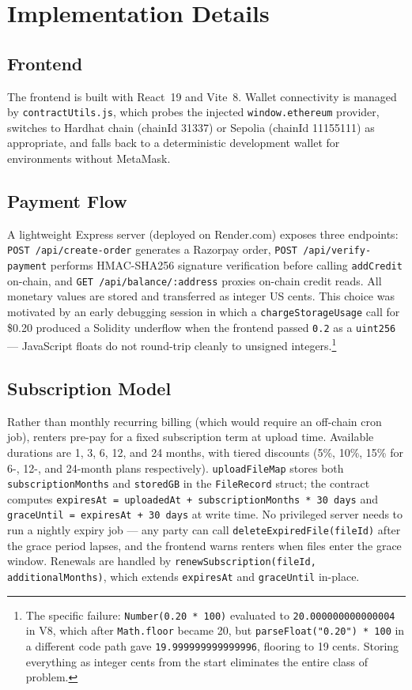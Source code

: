 \documentclass[journal]{IEEEtran}
\begin{document}
\section{Implementation Details}

\subsection{Frontend}
The frontend is built with React~19 and Vite~8.
%
Wallet connectivity is managed by \texttt{contractUtils.js}, which probes
the injected \texttt{window.ethereum} provider, switches to Hardhat chain
(chainId 31337) or Sepolia (chainId 11155111) as appropriate, and falls back
to a deterministic development wallet for environments without MetaMask.

\subsection{Payment Flow}
A lightweight Express server (deployed on Render.com) exposes three
endpoints: \texttt{POST /api/create-order} generates a Razorpay order,
\texttt{POST /api/verify-payment} performs HMAC-SHA256 signature
verification before calling \texttt{addCredit} on-chain, and
\texttt{GET /api/balance/:address} proxies on-chain credit reads.
%
All monetary values are stored and transferred as integer US cents.
This choice was motivated by an early debugging session in which a
\texttt{chargeStorageUsage} call for \$0.20 produced a Solidity
underflow when the frontend passed \texttt{0.2} as a
\texttt{uint256} — JavaScript floats do not round-trip cleanly to
unsigned integers.\footnote{The specific failure: \texttt{Number(0.20 * 100)} evaluated
to \texttt{20.000000000000004} in V8, which after \texttt{Math.floor}
became 20, but \texttt{parseFloat("0.20") * 100} in a different
code path gave \texttt{19.999999999999996}, flooring to 19 cents.
Storing everything as integer cents from the start eliminates
the entire class of problem.}

\subsection{Subscription Model}
Rather than monthly recurring billing (which would require an off-chain
cron job), renters pre-pay for a fixed subscription term at upload time.
Available durations are 1, 3, 6, 12, and 24 months, with tiered discounts
(5\%, 10\%, 15\% for 6-, 12-, and 24-month plans respectively).
\texttt{uploadFileMap} stores both \texttt{subscriptionMonths} and
\texttt{storedGB} in the \texttt{FileRecord} struct; the contract
computes \texttt{expiresAt = uploadedAt + subscriptionMonths * 30 days}
and \texttt{graceUntil = expiresAt + 30 days} at write time.
No privileged server needs to run a nightly expiry job — any party can
call \texttt{deleteExpiredFile(fileId)} after the grace period lapses,
and the frontend warns renters when files enter the grace window.
Renewals are handled by \texttt{renewSubscription(fileId, additionalMonths)},
which extends \texttt{expiresAt} and \texttt{graceUntil} in-place.
\end{document}
